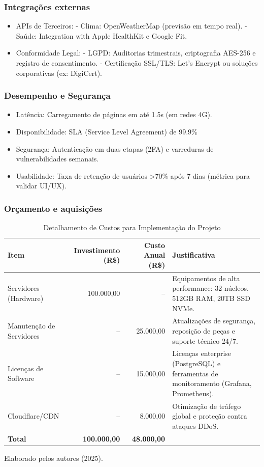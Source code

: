 \documentclass[a4paper, 12pt]{article}
\begin{document}
\subsubsection{Integrações externas}
\begin{itemize}[]
\item APIs de Terceiros:
- Clima: OpenWeatherMap (previsão em tempo real).
- Saúde: Integration with Apple HealthKit e Google Fit.
\item Conformidade Legal:
- LGPD: Auditorias trimestrais, criptografia AES-256 e registro de consentimento.
- Certificação SSL/TLS: Let's Encrypt ou soluções corporativas (ex: DigiCert).
\end{itemize}

\subsubsection*{Desempenho e Segurança}
\begin{itemize}[]
\item Latência: Carregamento de páginas em até 1.5s (em redes 4G).
\item Disponibilidade: SLA (Service Level Agreement) de 99.9\% 
\item Segurança: Autenticação em duas etapas (2FA) e varreduras de vulnerabilidades semanais.
\item Usabilidade: Taxa de retenção de usuários >70\% após 7 dias (métrica para validar UI/UX).
\end{itemize}

\subsubsection{Orçamento e aquisições}
\begin{table}[h]
\centering
\caption{Detalhamento de Custos para Implementação do Projeto}
\label{tab:custos}
\begin{tabular}{@{} >{\raggedright}p{2.5cm} r r p{3.5cm} @{}}
\toprule
\textbf{Item} & \textbf{Investimento (R\$)} & \textbf{Custo Anual (R\$)} & \textbf{Justificativa} \\
\midrule
Servidores (Hardware) & 100.000,00 & -- & Equipamentos de alta performance: 32 núcleos, 512GB RAM, 20TB SSD NVMe. \\
\addlinespace
Manutenção de Servidores & -- & 25.000,00 & Atualizações de segurança, reposição de peças e suporte técnico 24/7. \\
\addlinespace
Licenças de Software & -- & 15.000,00 & Licenças enterprise (PostgreSQL) e ferramentas de monitoramento (Grafana, Prometheus). \\
\addlinespace
Cloudflare/CDN & -- & 8.000,00 & Otimização de tráfego global e proteção contra ataques DDoS. \\
\bottomrule
\textbf{Total} & \textbf{100.000,00} & \textbf{48.000,00} & \\
\bottomrule
\end{tabular}

\smallskip
Elaborado pelos autores (2025).
\end{table}
\end{document}
